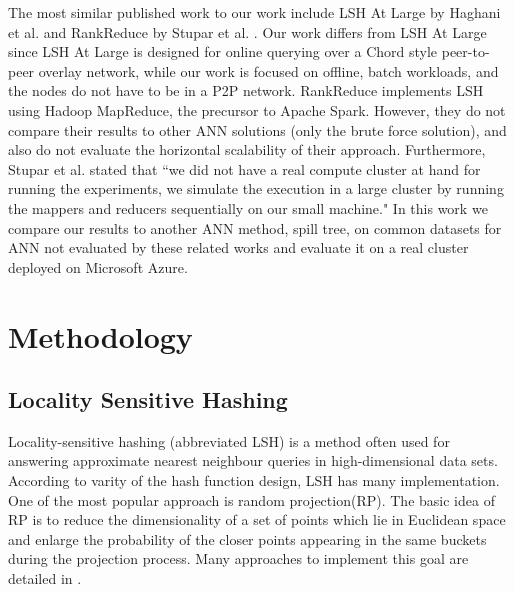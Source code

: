 \documentclass[letterpaper,twocolumn,10pt]{article}
\theoremstyle{definition}
\begin{document}
The most similar published work to our work include LSH At Large by Haghani et al. 
\cite{haghani2008lsh} and RankReduce by Stupar et al. \cite{stupar2010rankreduce}. 
Our work differs from LSH At Large since LSH At Large is designed for online 
querying over a Chord style peer-to-peer overlay network, while our work is focused 
on offline, batch workloads, and the nodes do not have to be in a P2P network. 
RankReduce implements LSH using Hadoop MapReduce, the precursor to Apache Spark. 
However, they do not compare their results to other ANN solutions (only the brute 
force solution), and also do not evaluate the horizontal scalability of their 
approach. Furthermore, Stupar et al. stated that ``we did not have a real compute 
cluster at hand for running the experiments, we simulate the execution in a large 
cluster by running the mappers and reducers sequentially on our small machine." In 
this work we compare our results to another ANN method, spill tree, on common 
datasets for ANN not evaluated by these related works and evaluate it 
on a real cluster deployed on Microsoft Azure.


\section{Methodology}



\subsection{Locality Sensitive Hashing}
Locality-sensitive hashing (abbreviated LSH) is a method often used for answering approximate 
nearest neighbour queries in high-dimensional data sets. According to varity of the hash function 
design, LSH has many implementation. One of the most popular approach is random projection(RP). 
The basic idea of RP is to reduce the dimensionality of a set of points which lie in Euclidean space and 
enlarge the probability of the closer points appearing in the same buckets during the projection 
process. Many approaches to implement this goal are detailed in \cite{wang2014hashing}.
\end{document}

